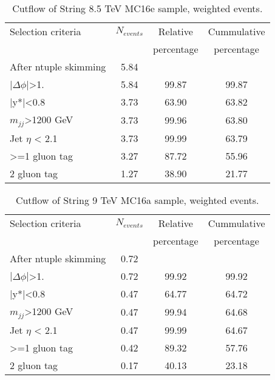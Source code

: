 \begin{table}[ht]
\begin{center}
\begin{tabular}{|l|c|c|c|}
\hline
Selection criteria & $N_{events}$ & Relative & Cummulative \\
 & & percentage & percentage \\
\hline
After ntuple skimming & 5.84 &  &  \\
$|\Delta\phi|$>1. & 5.84 & 99.87 & 99.87 \\
|y*|<0.8 & 3.73 & 63.90 & 63.82 \\
$m_{jj}$>1200 GeV & 3.73 & 99.96 & 63.80 \\
Jet $\eta$ < 2.1 & 3.73 & 99.99 & 63.79 \\
>=1 gluon tag & 3.27 & 87.72 & 55.96 \\
2 gluon tag & 1.27 & 38.90 & 21.77 \\
\hline
\end{tabular}
\end{center}
\caption{Cutflow of String 8.5 TeV MC16e sample, weighted events.}
\label{tab:String8p5MC16e}
\end{table}

\begin{table}[ht]
\begin{center}
\begin{tabular}{|l|c|c|c|}
\hline
Selection criteria & $N_{events}$ & Relative & Cummulative \\
 & & percentage & percentage \\
\hline
After ntuple skimming & 0.72 &  &  \\
$|\Delta\phi|$>1. & 0.72 & 99.92 & 99.92 \\
|y*|<0.8 & 0.47 & 64.77 & 64.72 \\
$m_{jj}$>1200 GeV & 0.47 & 99.94 & 64.68 \\
Jet $\eta$ < 2.1 & 0.47 & 99.99 & 64.67 \\
>=1 gluon tag & 0.42 & 89.32 & 57.76 \\
2 gluon tag & 0.17 & 40.13 & 23.18 \\
\hline
\end{tabular}
\end{center}
\caption{Cutflow of String 9 TeV MC16a sample, weighted events.}
\label{tab:String9MC16a}
\end{table}

